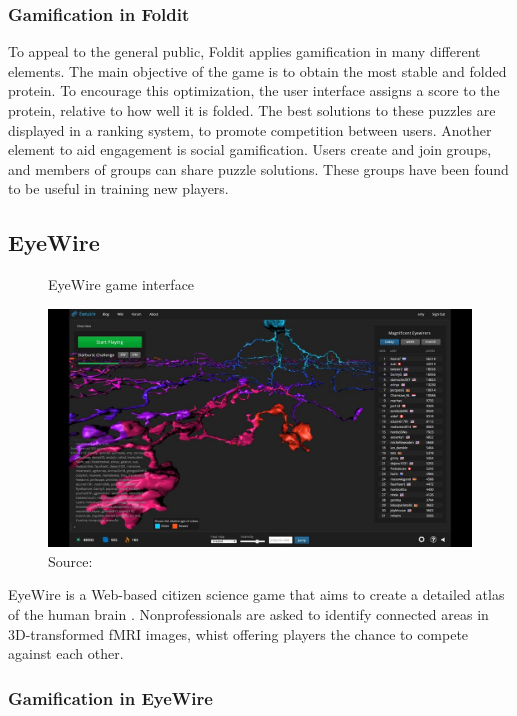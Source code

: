\subsubsection{Gamification in Foldit}

To appeal to the general public, Foldit applies gamification in many different elements. The main objective of the game is to obtain the most stable and folded protein. To encourage this optimization, the user interface assigns a score to the protein, relative to how well it is folded. The best solutions to these puzzles are displayed in a ranking system, to promote competition between users. Another element to aid engagement is social gamification. Users create and join groups, and members of groups can share puzzle solutions. These groups have been found to be useful in training new players.

\subsection{EyeWire}

\begin{figure}[ht]
    \centering
    \caption{EyeWire game interface}
    \includegraphics[width=0.8\linewidth]{images/background/eyewire.jpg}
    \caption{Source: \cite{eyewire2014how}}
    \label{fig:eyewire-game-interface}
\end{figure}

EyeWire is a Web-based citizen science game that aims to create a detailed atlas of the human brain \cite{tinati2016because}. Nonprofessionals are asked to identify connected areas in 3D-transformed fMRI images, whist offering players the chance to compete against each other.   

\subsubsection{Gamification in EyeWire}

